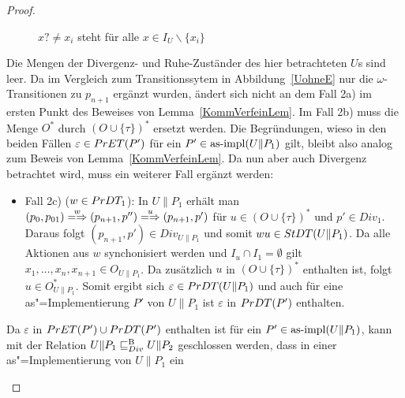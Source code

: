 \begin{proof}
\begin{itemize}
\begin{figure} [h!tbp]
\begin{center}
        \caption{$x?\neq x_i$ steht für alle $x\in I_U\backslash\{x_i\}$}
      \label{UohneEmitO}
      \end{center}
      \end{figure}
      Die Mengen der Divergenz- und Ruhe-Zuständer des hier betrachteten $U$s
      sind leer. Da im Vergleich zum Transitionssytem in Abbildung~\ref{UohneE}
      nur die $\omega$-Transitionen zu $p_{n+1}$ ergänzt wurden, ändert sich
      nicht an dem Fall 2a) im ersten Punkt des Beweises von
      Lemma~\ref{KommVerfeinLem}. Im Fall 2b) muss die Menge $O^*$ durch
      $(O\cup\{\tau\})^*$ ersetzt werden. Die Begründungen, wieso in den beiden
      Fällen $\varepsilon\in PrET (P')$ für ein $P'\in\mathrm{as}\text{-}\mathrm{impl} (U\|P_1)$ gilt,
      bleibt also analog zum Beweis von Lemma~\ref{KommVerfeinLem}. Da nun aber
      auch Divergenz betrachtet wird, muss ein weiterer Fall ergänzt werden:
      \begin{itemize}
        \item Fall 2c) ($w\in PrDT _1$): In $U\|P_1$ erhält man $(p_0,p_{01})
          \weakmay[w] (p_{n+1},p'')\weakmay[u] (p_{n+1},p')$ für $u\in (O\cup
          \{\tau\})^*$ und $p'\in Div_1$. Daraus folgt $(p_{n+1},p')\in
          Div_{U\|P_1}$ und somit $wu\in StDT (U\|P_1)$. Da alle Aktionen aus
          $w$ synchonisiert werden und $I_u\cap I_1=\emptyset$ gilt $x_1,\dots
          , x_n, x_{n+1}\in O_{U\|P_1}$. Da zusätzlich $u$ in $(O\cup \{\tau\})
          ^*$ enthalten ist, folgt $u\in O^*_{U\|P_1}$. Somit ergibt sich
          $\varepsilon\in PrDT (U\|P_1)$ und auch für eine as"=Implementierung
          $P'$ von $U\|P_1$ ist $\varepsilon$ in $PrDT (P')$ enthalten.
      \end{itemize}
      Da $\varepsilon$ in $PrET (P') \cup PrDT (P')$ enthalten ist für ein
      $P'\in\mathrm{as}\text{-}\mathrm{impl} (U\|P_1)$, kann mit der Relation $U\|P_1 \sqsubseteq  _{Div}^\mathrm{B} U\|P_2$
      geschlossen werden, dass in einer as"=Implementierung von $U\|P_1$ ein

\end{itemize}
\end{proof}
